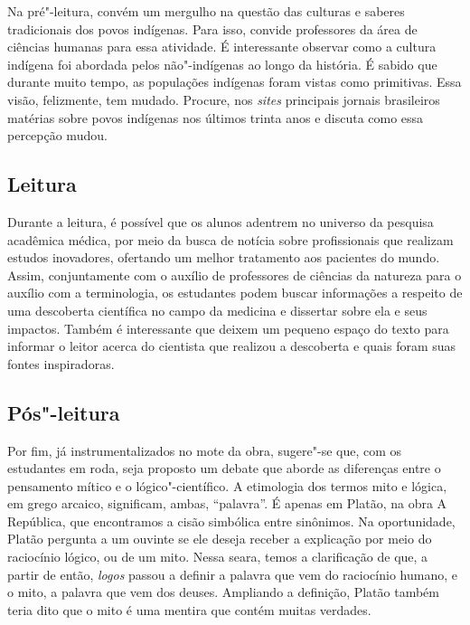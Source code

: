 \documentclass[12pt]{extarticle}
\begin{document}
Na pré"-leitura, convém um mergulho na questão das culturas e
saberes tradicionais dos povos indígenas. Para isso, convide professores da área de ciências humanas para essa atividade. É interessante observar como a cultura indígena foi abordada pelos não"-indígenas ao longo da história. É sabido que durante muito tempo, as populações indígenas foram vistas como primitivas. Essa visão, felizmente, tem mudado. Procure, 
nos \textit{sites} principais jornais brasileiros 
matérias sobre povos indígenas nos últimos trinta anos e discuta como
essa percepção mudou.



\subsection{Leitura}

Durante a leitura, é possível que os alunos adentrem no
universo da pesquisa acadêmica médica, por meio da busca de notícia sobre profissionais que realizam estudos inovadores, ofertando um melhor
tratamento aos pacientes do mundo. Assim, conjuntamente com o auxílio de
professores de ciências da natureza para o auxílio com a terminologia,
os estudantes podem buscar informações a respeito de uma descoberta
científica no campo da medicina e dissertar sobre ela e seus impactos. Também é interessante que deixem um pequeno espaço do texto para informar o leitor acerca do cientista que realizou a descoberta e quais foram suas fontes
inspiradoras.


\subsection{Pós"-leitura}

Por fim, já instrumentalizados no mote da obra, sugere"-se
que, com os estudantes em roda, seja proposto um debate que aborde as
diferenças entre o pensamento mítico e o lógico"-científico. A etimologia
dos termos mito e lógica, em grego arcaico, significam, ambas,
``palavra''. É apenas em Platão, na obra A República, que encontramos a
cisão simbólica entre sinônimos. Na oportunidade, Platão pergunta a um
ouvinte se ele deseja receber a explicação por meio do raciocínio
lógico, ou de um mito. Nessa seara, temos a clarificação de que, a
partir de então, \emph{logos} passou a definir a palavra que vem do raciocínio
humano, e o mito, a palavra que vem dos deuses. Ampliando a definição,
Platão também teria dito que o mito é uma mentira que contém muitas
verdades.
\end{document}
